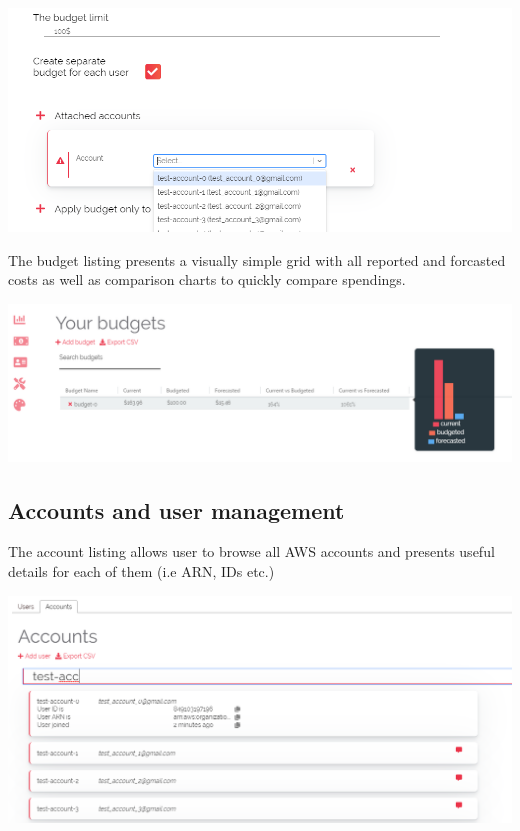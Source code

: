 \documentclass[licencjacka,en]{thesisclass}
\begin{document}
    \includegraphics[width=\textwidth] {imgs/screenshots/screen_budgets_create.png}
    
    The budget listing presents a visually simple grid with all reported and forcasted costs as well as comparison charts to quickly compare spendings.
    
    \includegraphics[width=\textwidth] {imgs/screenshots/screen_budgets_browse.png}
    
    \subsection{Accounts and user management}
    
    The account listing allows user to browse all AWS accounts and presents useful details for each of them (i.e ARN, IDs etc.)
    
    \includegraphics[width=\textwidth] {imgs/screenshots/screen_accounts_browse.png}
    
\end{document}
